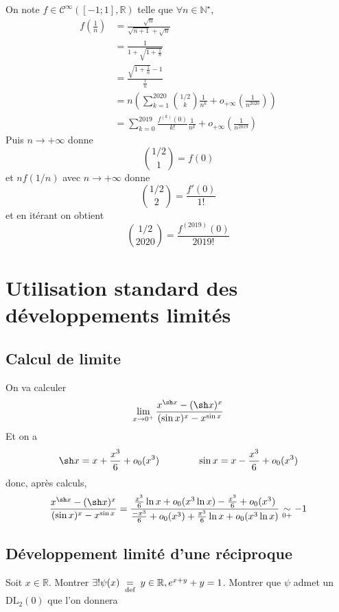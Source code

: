 \begin{ex}[$b$]
    On note $f\in\mathcal C^{\infty}([-1; 1], \mathbb R)$ telle que $\forall n\in\mathbb N^\star$, \begin{align*}
        f \left( \frac1n \right) &= \frac{\sqrt n}{\sqrt{n+1}+\sqrt n}\\
                                 &= \frac1{1+\sqrt{1+\frac1n}}\\
                                 &= \frac{\sqrt{1+\frac1n}-1}{\frac 1n}\\
                                 &= n \left( \sum_{k=1}^{2020}\binom {1/2}{k}\frac1{n^k}+o_{+\infty}(\frac{1}{n^{2020}}) \right) \\
                                 &= \sum_{k=0}^{2019}\frac{f^{(k)}(0)}{k!}\frac1{n^k}+o_{+\infty}(\frac1{n^{2019}})
    \end{align*}
    Puis $n\to +\infty$ donne \[
        \binom{1/2}1=f(0)
    \]
    et $nf(1/n)$ avec $n\to+\infty$ donne \[
        \binom{1/2}2=\frac{f'(0)}{1!}
    \]
    et en itérant on obtient \[
        \binom{1/2}{2020}=\frac{f^{(2019)}(0)}{2019!}
    \]
\end{ex}

\section{Utilisation standard des développements limités}

\subsection{Calcul de limite}

On va calculer \[
    \lim_{x\to 0^+}\frac{x^{\sh x}-(\sh x)^x}{(\sin x)^x-x^{\sin x}}
\]
Et on a \[
    \sh x=x+\frac{x^3}6+o_0(x^3)\qquad\qquad \sin x=x-\frac{x^3}6+o_0(x^3)
\]
donc, après calculs, \[
    \frac{x^{\sh x}-(\sh x)^x}{(\sin x)^x-x^{\sin x}} = \frac{\frac{x^3}6\ln x+o_0(x^3\ln x)-\frac{x^3}6+o_0(x^3)}{\frac{-x^3}6+o_0(x^3)+\frac{x^3}6\ln x+o_0(x^3\ln x)}\underset{0+}\sim -1
\]

\subsection{Développement limité d'une réciproque}

\begin{exo}
    Soit $x\in\mathbb R$. Montrer $\exists!\psi(x)\;\underset{\text{def}}=\; y\in\mathbb R, e^{x+y}+y=1$. Montrer que $\psi$ admet un $\mathrm{DL}_2(0)$ que l'on donnera
\end{exo}

